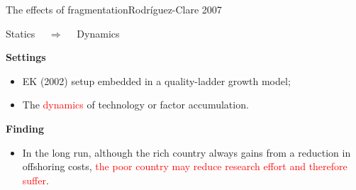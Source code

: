 \documentclass{beamer}
\begin{document}
\begin{frame}{The effects of fragmentation}{Rodr\'iguez-Clare 2007}
	\begin{block}{}
		\centering
		Statics $\quad \Rightarrow \quad$ Dynamics
	\end{block}
	\medskip
	\textbf{Settings}
	\begin{itemize}
		\item EK (2002) setup embedded in a quality-ladder growth model;
		\item The \textcolor{red}{dynamics} of technology or factor accumulation.
	\end{itemize}
	\medskip
	\textbf{Finding}
	\begin{itemize}
		\item In the long run, although the rich country always gains from a reduction in offshoring costs, \textcolor{red}{the poor country may reduce research effort and therefore suffer}.
	\end{itemize}
\end{frame}
\end{document}
